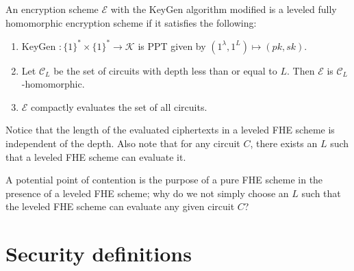 \begin{definition}
An encryption scheme $\mathcal{E}$ with the KeyGen algorithm modified is a leveled fully homomorphic encryption scheme if it satisfies the following:
\begin{enumerate}[label={$\bullet$}]
    \item KeyGen $\colon \{1\}^* \times \{1\}^* \to \mathcal{K}$ is PPT given by $(1^{\lambda},1^L) \mapsto (pk,sk)$.
    \item Let $\mathcal{C}_L$ be the set of circuits with depth less than or equal to $L$. Then $\mathcal{E}$ is $\mathcal{C}_L$-homomorphic.
    \item $\mathcal{E}$ compactly evaluates the set of all circuits. 
\end{enumerate}
\end{definition}
\begin{remark}
    Notice that the length of the evaluated ciphertexts in a leveled FHE scheme is independent of the depth.
    Also note that for any circuit $C$, there exists an $L$ such that a leveled FHE scheme can evaluate it.
\end{remark}

A potential point of contention is the purpose of a pure FHE scheme in the presence of a leveled FHE scheme; why do we not simply choose an $L$ such that the leveled FHE scheme can evaluate any given circuit $C$?


\section{Security definitions}

